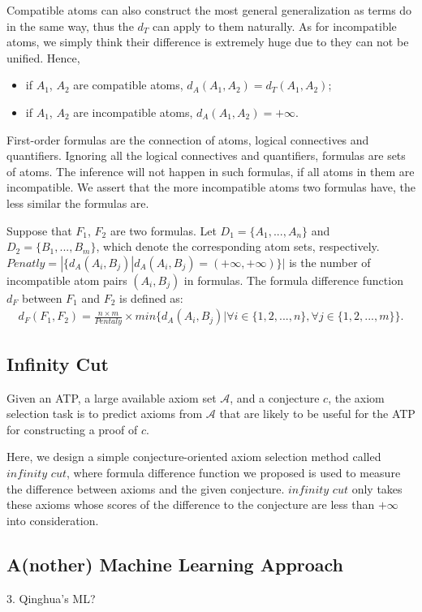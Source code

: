 \documentclass[EPiC]{easychair}
\begin{document}
Compatible atoms can also construct the most general generalization as terms do in the same way, thus the $d_T$ can apply to them naturally. As for incompatible atoms, we simply think their difference is extremely huge due to they can not be unified. Hence,
\begin{itemize}
	\item if $A_1$, $A_2$ are compatible atoms, $d_A(A_1,A_2)=d_T(A_1, A_2)$;
	\item if $A_1$, $A_2$ are incompatible atoms, $d_A(A_1,A_2)=+\infty$.
\end{itemize}

First-order formulas are the connection of atoms, logical connectives and quantifiers. Ignoring all the logical connectives and quantifiers, formulas are sets of atoms. The inference will not happen in such formulas, if all atoms in them are incompatible. We assert that the more incompatible atoms two formulas have, the less similar the formulas are.

Suppose that $F_1$, $F_2$ are two formulas. Let $D_1=\{A_1, ..., A_n\}$ and $D_2=\{B_1, ..., B_m\}$, which denote the corresponding atom sets, respectively. $Penatly=|\{d_A(A_i,B_j) | d_A(A_i,B_j)=(+\infty, +\infty)\}|$ is the number of incompatible atom pairs $(A_i,B_j)$ in formulas. The formula difference function $d_F$ between $F_1$ and $F_2$ is defined as:
	\begin{align}
		d_F(F_1, F_2) = \frac{n\times m}{Pentaly}\times min\{d_A(A_i, B_j) |\forall i \in \{1,2,...,n\}, \forall j \in \{1,2,...,m\}\}.
	\end{align}
\subsection{Infinity Cut}
Given an ATP, a large available axiom set $\mathcal{A}$, and a conjecture $c$, the axiom selection task is to predict axioms from $\mathcal{A}$ that are likely to be useful for the ATP for constructing a proof of $c$.

Here, we design a simple conjecture-oriented axiom selection method called $infinity$ $cut$, where formula difference function we proposed is used to measure the difference between axioms and the given conjecture. $infinity$ $cut$ only takes these axioms whose scores of the difference to the conjecture are less than $+\infty$ into consideration.
\subsection{A(nother) Machine Learning Approach}
\label{QinghuaML}
3. Qinghua's ML?
\end{document}
